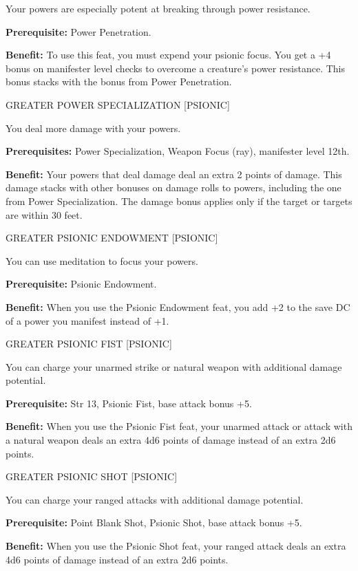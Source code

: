 \documentclass{article}
\begin{document}
Your powers are especially potent at breaking through power resistance.

\textbf{Prerequisite:} Power Penetration.

\textbf{Benefit:} To use this feat, you must expend your psionic focus. You get 
a +4 bonus on manifester level checks to overcome a creature's power resistance. 
This bonus stacks with the bonus from Power Penetration.

\vspace{12pt}
GREATER POWER SPECIALIZATION [PSIONIC]

You deal more damage with your powers.

\textbf{Prerequisites:} Power Specialization, Weapon Focus (ray), manifester level 
12th.

\textbf{Benefit:} Your powers that deal damage deal an extra 2 points of damage. 
This damage stacks with other bonuses on damage rolls to powers, including the 
one from Power Specialization. The damage bonus applies only if the target or targets 
are within 30 feet.

\vspace{12pt}
GREATER PSIONIC ENDOWMENT [PSIONIC]

You can use meditation to focus your powers.

\textbf{Prerequisite:} Psionic Endowment.

\textbf{Benefit:} When you use the Psionic Endowment feat, you add +2 to the save 
DC of a power you manifest instead of +1.

\vspace{12pt}
GREATER PSIONIC FIST [PSIONIC]

You can charge your unarmed strike or natural weapon with additional damage potential.

\textbf{Prerequisite:} Str 13, Psionic Fist, base attack bonus +5.

\textbf{Benefit:} When you use the Psionic Fist feat, your unarmed attack or attack 
with a natural weapon deals an extra 4d6 points of damage instead of an extra 2d6 
points.

\vspace{12pt}
GREATER PSIONIC SHOT [PSIONIC]

You can charge your ranged attacks with additional damage potential.

\textbf{Prerequisite:} Point Blank Shot, Psionic Shot, base attack bonus +5.

\textbf{Benefit:} When you use the Psionic Shot feat, your ranged attack deals 
an extra 4d6 points of damage instead of an extra 2d6 points.
\end{document}
